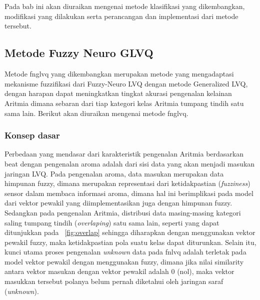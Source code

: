 \chapter{\babEmpat}
\label{ch:fnglvq}
Pada bab ini akan diuraikan mengenai metode klasifikasi yang dikembangkan,
modifikasi yang dilakukan serta perancangan dan implementasi dari metode
tersebut.
 
\section{Metode Fuzzy Neuro GLVQ}
Metode \gls{fnglvq} yang dikembangkan merupakan metode yang
mengadaptasi mekanisme fuzzifikasi dari Fuzzy-Neuro LVQ dengan metode Generalized LVQ, dengan
harapan dapat meningkatkan tingkat akurasi pengenalan kelainan Aritmia dimana
sebaran dari tiap kategori kelas Aritmia tumpang tindih satu sama lain. Berikut
akan diuraikan mengenai metode \gls{fnglvq}.


\subsection{Konsep dasar}
\label{ssec:konsep-dasar}
Perbedaan yang mendasar dari karakteristik pengenalan Aritmia berdasarkan beat
dengan pengenalan aroma adalah dari sisi data yang akan menjadi masukan
jaringan LVQ. Pada pengenalan aroma, data masukan merupakan data himpunan
fuzzy, dimana merupakan representasi dari ketidakpastian (\emph{fuzziness})
sensor dalam membaca informasi aroma, dimana hal ini berimplikasi pada model
dari vektor pewakil yang diimplementasikan juga dengan himpunan fuzzy. Sedangkan
pada pengenalan Aritmia, distribusi data masing-masing kategori saling tumpang
tindih (\emph{overlaping}) satu sama lain, seperti yang dapat ditunjukkan pada
\pic~\ref{fig:overlap} sehingga diharapkan dengan menggunakan vektor pewakil
fuzzy, maka ketidakpastian pola suatu kelas dapat diturunkan. Selain itu, kunci
utama proses pengenalan \emph{unknown} data pada \gls{fnlvq} adalah terletak
pada model vektor pewakil dengan menggunakan fuzzy, dimana jika nilai
similarity antara vektor masukan dengan vektor pewakil adalah 0 (nol), maka
vektor masukkan tersebut polanya belum pernah diketahui oleh jaringan saraf
(\emph{unknown}).
 
